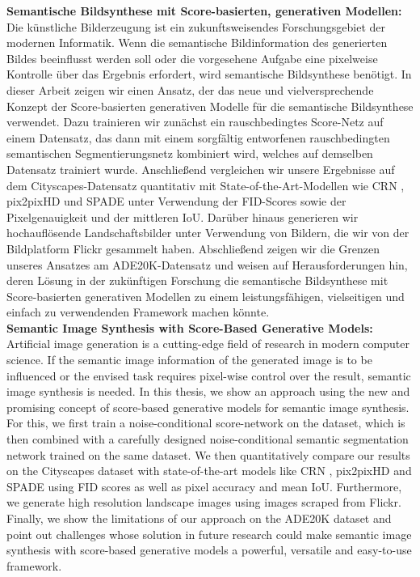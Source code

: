 \noindent\textbf{Semantische Bildsynthese mit Score-basierten, generativen Modellen:}\\[0.3cm]
\noindent Die künstliche Bilderzeugung ist ein zukunftsweisendes Forschungsgebiet der modernen Informatik. Wenn die semantische Bildinformation des generierten Bildes beeinflusst werden soll oder die vorgesehene Aufgabe eine pixelweise Kontrolle über das Ergebnis erfordert, wird semantische Bildsynthese benötigt. In dieser Arbeit zeigen wir einen Ansatz, der das neue und vielversprechende Konzept der Score-basierten generativen Modelle für die semantische Bildsynthese verwendet. Dazu trainieren wir zunächst ein rauschbedingtes Score-Netz auf einem Datensatz, das dann mit einem sorgfältig entworfenen rauschbedingten semantischen Segmentierungsnetz kombiniert wird, welches auf demselben Datensatz trainiert wurde. Anschließend vergleichen wir unsere Ergebnisse auf dem Cityscapes-Datensatz \cite{cityscapes} quantitativ mit State-of-the-Art-Modellen wie CRN \cite{crn}, pix2pixHD \cite{pix2pixHD} und SPADE \cite{spade} unter Verwendung der FID-Scores sowie der Pixelgenauigkeit und der mittleren IoU. Darüber hinaus generieren wir hochauflösende Landschaftsbilder unter Verwendung von Bildern, die wir von der Bildplatform Flickr gesammelt haben. Abschließend zeigen wir die Grenzen unseres Ansatzes am ADE20K-Datensatz \cite{ade20k} und weisen auf Herausforderungen hin, deren Lösung in der zukünftigen Forschung die semantische Bildsynthese mit Score-basierten generativen Modellen zu einem leistungsfähigen, vielseitigen und einfach zu verwendenden Framework machen könnte.\\[0.3cm]
\noindent\textbf{Semantic Image Synthesis with Score-Based Generative Models:}\\[0.3cm]
\noindent Artificial image generation is a cutting-edge field of research in modern computer science. If the semantic image information of the generated image is to be influenced or the envised task requires pixel-wise control over the result, semantic image synthesis is needed. In this thesis, we show an approach using the new and promising concept of score-based generative models for semantic image synthesis. For this, we first train a noise-conditional score-network on the dataset, which is then combined with a carefully designed noise-conditional semantic segmentation network trained on the same dataset. We then quantitatively compare our results on the Cityscapes dataset \cite{cityscapes} with state-of-the-art models like CRN \cite{crn}, pix2pixHD \cite{pix2pixHD} and SPADE \cite{spade} using FID scores as well as pixel accuracy and mean IoU. Furthermore, we generate high resolution landscape images using images scraped from Flickr. Finally, we show the limitations of our approach on the ADE20K dataset \cite{ade20k} and point out challenges whose solution in future research could make semantic image synthesis with score-based generative models a powerful, versatile and easy-to-use framework.